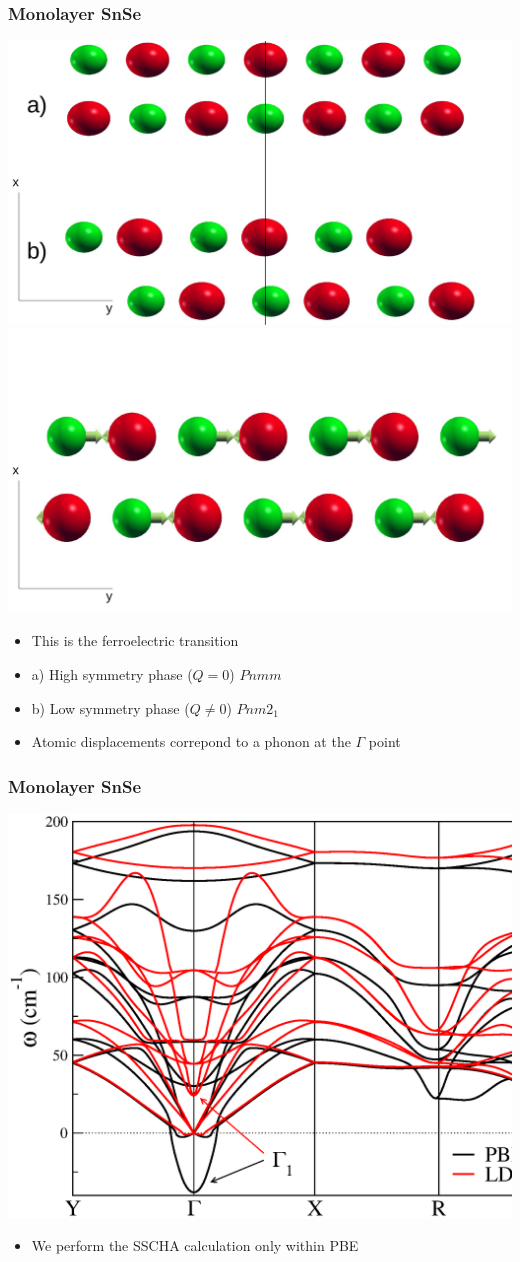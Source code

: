 \documentclass{beamer}
\begin{document}
\begin{frame}

\frametitle{Monolayer SnSe}
\begin{center}
 \includegraphics[width=0.49\linewidth]{Pictures/MonoSnSe/monolayer-structure.pdf}
 \includegraphics[width=0.49\linewidth]{Pictures/MonoSnSe/transition-mono.pdf}
\end{center}
\begin{itemize}
 \item This is the ferroelectric transition
 \item a) High symmetry phase ($Q=0$) $Pnmm$
 \item b) Low symmetry phase ($Q\ne0$) $Pnm2_{1}$
 \item Atomic displacements correpond to a phonon at the $\Gamma$ point
\end{itemize}

\end{frame}


\begin{frame}

\frametitle{Monolayer SnSe}
\begin{center}
 \includegraphics[width=0.8\linewidth]{Pictures/MonoSnSe/harmonic-mono.eps}
\end{center}
\begin{itemize}
 \item We perform the SSCHA calculation only within PBE
\end{itemize}

\end{frame}
\end{document}
